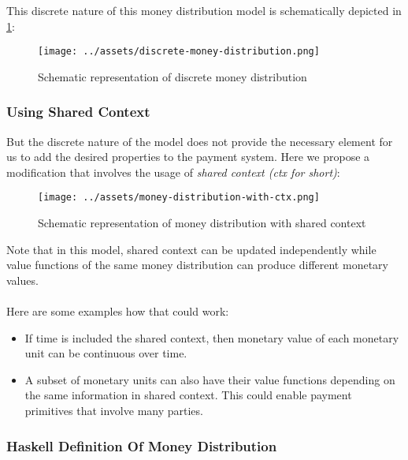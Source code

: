 \documentclass[a4paper,10pt]{report}
\begin{document}
This discrete nature of this money distribution model is schematically depicted in {\ref{fig:discrete-md}}:

\begin{figure}[h]
    \centering
    \texttt{[image: ../assets/discrete-money-distribution.png]}
    \caption{Schematic representation of discrete money distribution}
    \label{fig:discrete-md}
\end{figure}

\subsubsection{Using Shared Context}

But the discrete nature of the model does not provide the necessary element for us to add the desired properties to the
payment system. Here we propose a modification that involves the usage of \textit{shared context (ctx for short)}:

\begin{figure}[h]
    \centering
    \texttt{[image: ../assets/money-distribution-with-ctx.png]}
    \caption{Schematic representation of money distribution with shared context}
    \label{fig:md-with-ctx}
\end{figure}

Note that in this model, shared context can be updated independently while value functions of the same money
distribution can produce different monetary values.

\paragraph{}

Here are some examples how that could work:

\begin{itemize}
\item If time is included the shared context, then monetary value of each monetary unit can be continuous over time.
\item A subset of monetary units can also have their value functions depending on the same information in shared
    context. This could enable payment primitives that involve many parties.
\end{itemize}

\subsubsection{Haskell Definition Of Money Distribution}
\end{document}
